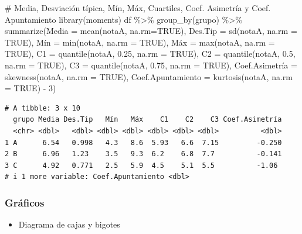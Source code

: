 \documentclass[
  a4paper,
]{scrreport}
\newenvironment{Shaded}{\begin{snugshade}}{\end{snugshade}}
\newcommand{\AttributeTok}[1]{\textcolor[rgb]{0.40,0.45,0.13}{#1}}
\newcommand{\CommentTok}[1]{\textcolor[rgb]{0.37,0.37,0.37}{#1}}
\newcommand{\ConstantTok}[1]{\textcolor[rgb]{0.56,0.35,0.01}{#1}}
\newcommand{\DecValTok}[1]{\textcolor[rgb]{0.68,0.00,0.00}{#1}}
\newcommand{\FloatTok}[1]{\textcolor[rgb]{0.68,0.00,0.00}{#1}}
\newcommand{\FunctionTok}[1]{\textcolor[rgb]{0.28,0.35,0.67}{#1}}
\newcommand{\NormalTok}[1]{\textcolor[rgb]{0.00,0.23,0.31}{#1}}
\newcommand{\OtherTok}[1]{\textcolor[rgb]{0.00,0.23,0.31}{#1}}
\newcommand{\SpecialCharTok}[1]{\textcolor[rgb]{0.37,0.37,0.37}{#1}}
\providecommand{\tightlist}{%
  \setlength{\itemsep}{0pt}\setlength{\parskip}{0pt}}\usepackage{longtable,booktabs,array}
\theoremstyle{definition}
\theoremstyle{definition}
\theoremstyle{remark}
\begin{document}
\begin{Shaded}
\begin{Highlighting}[]
\CommentTok{\# Media, Desviación típica, Mín, Máx, Cuartiles, Coef. Asimetría y Coef. Apuntamiento}
\FunctionTok{library}\NormalTok{(moments)}
\NormalTok{df }\SpecialCharTok{\%\textgreater{}\%} \FunctionTok{group\_by}\NormalTok{(grupo) }\SpecialCharTok{\%\textgreater{}\%} \FunctionTok{summarize}\NormalTok{(}\AttributeTok{Media =} \FunctionTok{mean}\NormalTok{(notaA, }\AttributeTok{na.rm=}\ConstantTok{TRUE}\NormalTok{), }\AttributeTok{Des.Tip =} \FunctionTok{sd}\NormalTok{(notaA, }\AttributeTok{na.rm =} \ConstantTok{TRUE}\NormalTok{), Mín }\OtherTok{=} \FunctionTok{min}\NormalTok{(notaA, }\AttributeTok{na.rm =} \ConstantTok{TRUE}\NormalTok{), Máx }\OtherTok{=} \FunctionTok{max}\NormalTok{(notaA, }\AttributeTok{na.rm =} \ConstantTok{TRUE}\NormalTok{), }\AttributeTok{C1 =} \FunctionTok{quantile}\NormalTok{(notaA, }\FloatTok{0.25}\NormalTok{, }\AttributeTok{na.rm =} \ConstantTok{TRUE}\NormalTok{), }\AttributeTok{C2 =} \FunctionTok{quantile}\NormalTok{(notaA, }\FloatTok{0.5}\NormalTok{, }\AttributeTok{na.rm =} \ConstantTok{TRUE}\NormalTok{), }\AttributeTok{C3 =} \FunctionTok{quantile}\NormalTok{(notaA, }\FloatTok{0.75}\NormalTok{, }\AttributeTok{na.rm =} \ConstantTok{TRUE}\NormalTok{), Coef.Asimetría }\OtherTok{=} \FunctionTok{skewness}\NormalTok{(notaA, }\AttributeTok{na.rm =} \ConstantTok{TRUE}\NormalTok{), }\AttributeTok{Coef.Apuntamiento =} \FunctionTok{kurtosis}\NormalTok{(notaA, }\AttributeTok{na.rm =} \ConstantTok{TRUE}\NormalTok{) }\SpecialCharTok{{-}} \DecValTok{3}\NormalTok{)}
\end{Highlighting}
\end{Shaded}

\begin{verbatim}
# A tibble: 3 x 10
  grupo Media Des.Tip   Mín   Máx    C1    C2    C3 Coef.Asimetría
  <chr> <dbl>   <dbl> <dbl> <dbl> <dbl> <dbl> <dbl>          <dbl>
1 A      6.54   0.998   4.3   8.6  5.93   6.6  7.15         -0.250
2 B      6.96   1.23    3.5   9.3  6.2    6.8  7.7          -0.141
3 C      4.92   0.771   2.5   5.9  4.5    5.1  5.5          -1.06 
# i 1 more variable: Coef.Apuntamiento <dbl>
\end{verbatim}

\subsubsection{Gráficos}\label{gruxe1ficos-4}

\begin{itemize}
\tightlist
\item
  Diagrama de cajas y bigotes
\end{itemize}
\end{document}
